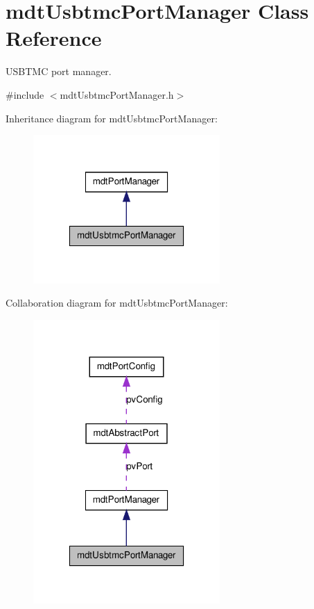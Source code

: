 \hypertarget{classmdt_usbtmc_port_manager}{
\section{mdtUsbtmcPortManager Class Reference}
\label{classmdt_usbtmc_port_manager}
}


USBTMC port manager.  




{\ttfamily \#include $<$mdtUsbtmcPortManager.h$>$}



Inheritance diagram for mdtUsbtmcPortManager:\nopagebreak
\begin{figure}[H]
\begin{center}
\leavevmode
\includegraphics[width=202pt]{classmdt_usbtmc_port_manager__inherit__graph}
\end{center}
\end{figure}


Collaboration diagram for mdtUsbtmcPortManager:\nopagebreak
\begin{figure}[H]
\begin{center}
\leavevmode
\includegraphics[width=202pt]{classmdt_usbtmc_port_manager__coll__graph}
\end{center}
\end{figure}
